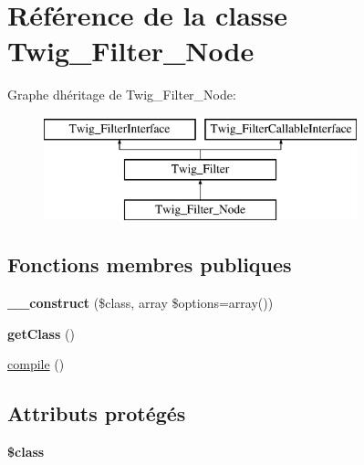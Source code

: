 \hypertarget{class_twig___filter___node}{}\section{Référence de la classe Twig\+\_\+\+Filter\+\_\+\+Node}
\label{class_twig___filter___node}
Graphe d\textquotesingle{}héritage de Twig\+\_\+\+Filter\+\_\+\+Node\+:\begin{figure}[H]
\begin{center}
\leavevmode
\includegraphics[height=3.000000cm]{class_twig___filter___node}
\end{center}
\end{figure}
\subsection*{Fonctions membres publiques}
\begin{DoxyCompactItemize}
\item 
{\bfseries \+\_\+\+\_\+construct} (\$class, array \$options=array())\hypertarget{class_twig___filter___node_ad54af67e0f4e88a0c80d60b51380a48e}{}\label{class_twig___filter___node_ad54af67e0f4e88a0c80d60b51380a48e}

\item 
{\bfseries get\+Class} ()\hypertarget{class_twig___filter___node_a23ecbde357f7f6bde5a50f876334a74d}{}\label{class_twig___filter___node_a23ecbde357f7f6bde5a50f876334a74d}

\item 
\hyperlink{class_twig___filter___node_a3815e7c2e73f00c2ebffcf5b90eef3b1}{compile} ()
\end{DoxyCompactItemize}
\subsection*{Attributs protégés}
\begin{DoxyCompactItemize}
\item 
{\bfseries \$class}\hypertarget{class_twig___filter___node_a252ba022809910ea710a068fc1bab657}{}\label{class_twig___filter___node_a252ba022809910ea710a068fc1bab657}

\end{DoxyCompactItemize}


